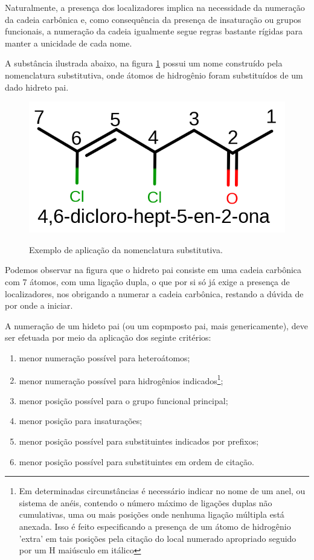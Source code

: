 Naturalmente, a presença dos localizadores implica na necessidade da numeração da cadeia carbônica e, como consequência da presença de insaturação ou grupos funcionais, a numeração da cadeia igualmente segue regras bastante rígidas para manter a unicidade de cada nome.

A substância ilustrada abaixo, na figura \ref{fig:46} possui um nome construído pela nomenclatura substitutiva, onde átomos de hidrogênio foram substituídos de um dado hidreto pai.

\begin{figure}[H]
	\centering
	\caption{Exemplo de aplicação da nomenclatura substitutiva.}
	\vspace{0.5cm}
	\includegraphics[width=0.6\linewidth]{imagens/46dicloro.png}
\label{fig:46}
\end{figure}

Podemos observar na figura que o hidreto pai consiste em uma cadeia carbônica com 7 átomos, com uma ligação dupla, o que por si só já exige a presença de localizadores, nos obrigando a numerar a cadeia carbônica, restando a dúvida de por onde a iniciar.

A numeração de um hideto pai (ou um copmposto pai, mais genericamente), deve ser efetuada por meio da aplicação dos seginte critérios:

\begin{enumerate}
	\item menor numeração possível para heteroátomos;
	\item menor numeração possível para hidrogênios indicados\footnote{Em determinadas circunstâncias é necessário indicar no nome de um anel, ou sistema de anéis, contendo o número máximo de ligações duplas não cumulativas, uma ou mais posições onde nenhuma ligação múltipla está anexada. Isso é feito especificando a presença de um átomo de hidrogênio 'extra' em tais posições pela citação do local numerado apropriado seguido por um H maiúsculo em itálico};
	\item menor posição possível para o grupo funcional principal;
	\item menor posição para insaturações;
	\item menor posição possível para substituintes indicados por prefixos;
	\item menor posição possível para substituintes em ordem de citação.
\end{enumerate}

